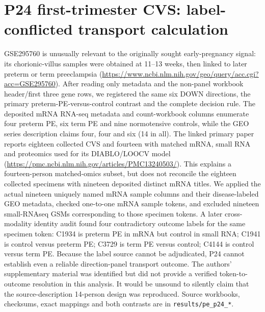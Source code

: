 \documentclass[11pt,a4paper]{article}
\begin{document}
\section{P24 first-trimester CVS: label-conflicted transport calculation}
GSE295760 is unusually relevant to the originally sought early-pregnancy signal: its chorionic-villus samples were obtained at 11--13 weeks, then linked to later preterm or term preeclampsia (\url{https://www.ncbi.nlm.nih.gov/geo/query/acc.cgi?acc=GSE295760}). After reading only metadata and the non-panel workbook header/first three gene rows, we registered the same six DOWN directions, the primary preterm-PE-versus-control contrast and the complete decision rule. The deposited mRNA RNA-seq metadata and count-workbook columns enumerate four preterm PE, six term PE and nine normotensive controls, while the GEO series description claims four, four and six (14 in all). The linked primary paper reports eighteen collected CVS and fourteen with matched mRNA, small RNA and proteomics used for its DIABLO/LOOCV model (\url{https://pmc.ncbi.nlm.nih.gov/articles/PMC13240503/}). This explains a fourteen-person matched-omics subset, but does not reconcile the eighteen collected specimens with nineteen deposited distinct mRNA titles. We applied the actual nineteen uniquely named mRNA sample columns and their disease-labeled GEO metadata, checked one-to-one mRNA sample tokens, and excluded nineteen small-RNAseq GSMs corresponding to those specimen tokens. A later cross-modality identity audit found four contradictory outcome labels for the same specimen token: C1934 is preterm PE in mRNA but control in small RNA; C1941 is control versus preterm PE; C3729 is term PE versus control; C4144 is control versus term PE. Because the label source cannot be adjudicated, P24 cannot establish even a reliable direction-panel transport outcome. The authors' supplementary material was identified but did not provide a verified token-to-outcome resolution in this analysis. It would be unsound to silently claim that the source-description 14-person design was reproduced. Source workbooks, checksums, exact mappings and both contrasts are in \texttt{results/pe\_p24\_*}.
\end{document}
